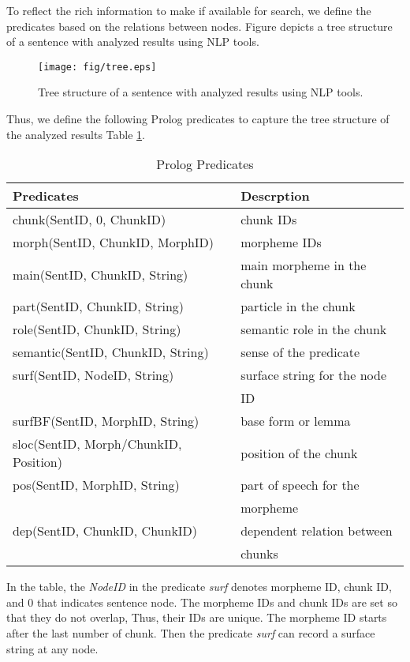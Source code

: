 \documentclass[conference]{IEEEtran}
\begin{document}
To reflect the rich information to make if available for search, we define the predicates
based on the relations between nodes. Figure \label{fig:tree} depicts a tree structure of
a sentence with analyzed results using NLP tools. 

\begin{figure}[htbp]
\centerline{\texttt{[image: fig/tree.eps]}}
\caption{Tree structure of a sentence with analyzed results using NLP tools.} 
\label{fig:tree}
\end{figure}

Thus, we define the following Prolog predicates to capture the tree structure of
the analyzed results Table \ref{tbl:predicates}. 

\begin{table}[htbp]
\caption{Prolog Predicates}
\begin{center}
  \begin{tabular}{|l|l|}\hline
      Predicates &  Descrption \\\hline
      chunk(SentID, 0, ChunkID) & chunk IDs  \\
      morph(SentID, ChunkID, MorphID) & morpheme IDs \\  
      main(SentID, ChunkID, String) & main morpheme in the chunk\\
      part(SentID, ChunkID, String) & particle in the chunk \\
      role(SentID, ChunkID, String) & semantic role in the chunk \\
      semantic(SentID, ChunkID, String) & sense of the predicate \\
      surf(SentID, NodeID, String) & surface string for the node\\
                       & ID \\
      surfBF(SentID, MorphID, String) & base form or lemma \\
      sloc(SentID, Morph/ChunkID, Position) & position of the chunk\\
      pos(SentID, MorphID, String) & part of speech for the \\
                                   &  morpheme\\
      dep(SentID, ChunkID, ChunkID) & dependent relation between \\
                        & chunks\\\hline
\end{tabular}
\label{tbl:predicates}
\end{center}
\end{table}
In the table, the {\it NodeID} in the predicate {\it surf} denotes
morpheme ID, chunk ID, and 0 that indicates sentence node.
The morpheme IDs and chunk IDs are set so that they do not overlap,
Thus, their IDs are unique. The morpheme ID starts after the last number
of chunk. Then the predicate {\it surf} can
record a surface string at any node.
\end{document}
